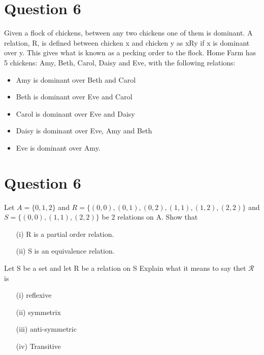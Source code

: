 \documentclass[12pt]{article} %
\begin{document}
\section*{Question 6}
Given a flock of chickens, between any two chickens one of them is
dominant. A relation, R, is defined between chicken x and chicken y as xRy if x is
dominant over y. This gives what is known as a pecking order to the flock. Home
Farm has 5 chickens: Amy, Beth, Carol, Daisy and Eve, with the following relations:

\begin{itemize}
	\item Amy is dominant over Beth and Carol
	\item Beth is dominant over Eve and Carol
	\item Carol is dominant over Eve and Daisy
	\item Daisy is dominant over Eve, Amy and Beth
	\item Eve is dominant over Amy.
\end{itemize}

\newpage
\section*{Question 6}

Let $A=\{0,1,2\}$ and $R=\{ (0,0),(0,1),(0,2),(1,1), (1,2), (2,2)\}$
and $S=\{(0,0),(1,1),(2,2)\}$ be 2 relations on A. Show that

\begin{itemize}
	\item[(i)] R is a partial order relation.
	\item[(ii)] S is an equivalence relation.
\end{itemize}

Let S be a set and let R be a relation on S
Explain what it means to say thet $\mathcal{R}$ is

\begin{itemize}
	\item[(i)] reflexive
	\item[(ii)] symmetrix
	\item[(iii)] anti-symmetric
	\item[(iv)] Transitive
	
	
	
\end{itemize}
\end{document}
